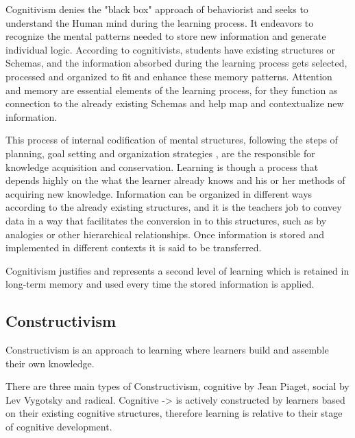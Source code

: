 Cognitivism denies the "black box" approach of behaviorist and seeks to understand
the Human mind during the learning process. It endeavors to recognize the mental 
patterns needed to store new information and generate individual logic.
According to cognitivists, students have existing structures or Schemas, and 
the information absorbed during the learning process gets selected, processed
and organized to fit and enhance these memory patterns. \cite{johnson}
Attention and memory are essential elements of the learning process, for they 
function as connection to the already existing Schemas and help map and contextualize
new information. 

This process of internal codification of mental structures, following the steps
of planning, goal setting and organization strategies \cite{johnson}, are the 
responsible for knowledge acquisition and conservation. Learning is though a 
process that depends highly on the what the learner already knows and his or her
methods of acquiring new knowledge. Information can be organized in different 
ways according to the already existing structures, and it is the teachers 
job to convey data in a way that facilitates the conversion in to this structures, 
such as by analogies or other hierarchical relationships. Once information is 
stored and implemented in different contexts it is said to be transferred. \cite{schunk}

Cognitivism justifies and represents a second level of learning which is retained
in long-term memory and used every time the stored information is applied.




\subsection{Constructivism}

Constructivism is an approach to learning where learners build 
and assemble their own knowledge.

There are three main types of Constructivism, cognitive by Jean Piaget, social
by Lev Vygotsky and radical.
Cognitive -> is actively constructed by learners based on their existing cognitive
structures, therefore learning is relative to their stage of cognitive development.


